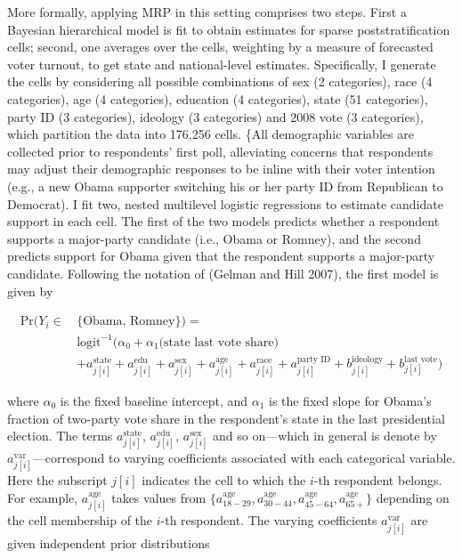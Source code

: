 More formally, applying MRP in this setting comprises two steps. First a
Bayesian hierarchical model is fit to obtain estimates for sparse
poststratification cells; second, one averages over the cells, weighting
by a measure of forecasted voter turnout, to get state and
national-level estimates. Specifically, I generate the cells by
considering all possible combinations of sex (2 categories), race (4
categories), age (4 categories), education (4 categories), state (51
categories), party ID (3 categories), ideology (3 categories) and 2008
vote (3 categories), which partition the data into 176,256 cells. \{All
demographic variables are collected prior to respondents' first poll,
alleviating concerns that respondents may adjust their demographic
responses to be inline with their voter intention (e.g., a new Obama
supporter switching his or her party ID from Republican to Democrat). I
fit two, nested multilevel logistic regressions to estimate candidate
support in each cell. The first of the two models predicts whether a
respondent supports a major-party candidate (i.e., Obama or Romney), and
the second predicts support for Obama given that the respondent supports
a major-party candidate. Following the notation of (Gelman and Hill
2007), the first model is given by

\begin{align}\label{eqn:m1}
  \text{Pr}(Y_i \in \, &\{\text{Obama, Romney}\})=\nonumber\\
  &\text{logit}^{-1}\big(\alpha_0+  \alpha_1\text{(state last vote share)} \\
  &+ a^{\text{state}}_{j[i]}+a^{\text{edu}}_{j[i]}+a^{\text{sex}}_{j[i]}+a^{\text{age}}_{j[i]}
  +a^{\text{race}}_{j[i]}+a^{\text{party ID}}_{j[i]}
  +b^{\text{ideology}}_{j[i]} + b^{\text{last vote}}_{j[i]} \big)\nonumber
\end{align}

where \(\alpha_0\) is the fixed baseline intercept, and \(\alpha_1\) is
the fixed slope for Obama's fraction of two-party vote share in the
respondent's state in the last presidential election. The terms
\(a^{\text{state}}_{j[i]}\), \(a^{\text{edu}}_{j[i]}\),
\(a^{\text{sex}}_{j[i]}\) and so on---which in general is denote by
\(a^{\text{var}}_{j[i]}\)---correspond to varying coefficients
associated with each categorical variable. Here the subscript \(j[i]\)
indicates the cell to which the \(i\)-th respondent belongs. For
example, \(a^{\text{age}}_{j[i]}\) takes values from
\(\{a^{\text{age}}_{18-29}, a^{\text{age}}_{30-44}, a^{\text{age}}_{45-64}, a^{\text{age}}_{65+}\}\)
depending on the cell membership of the \(i\)-th respondent. The varying
coefficients \(a_{j[i]}^{\text{var}}\) are given independent prior
distributions

